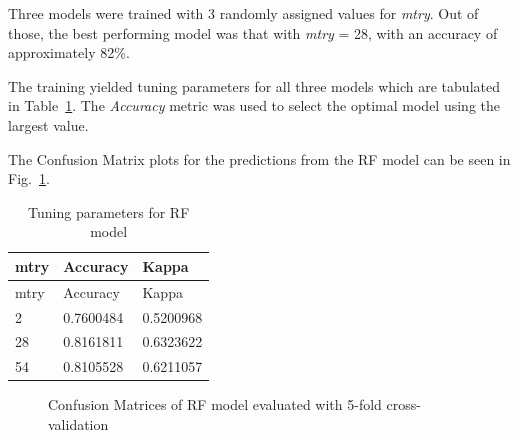 \documentclass[runningheads]{llncs}
\begin{document}
Three models were trained with 3 randomly assigned values for
\emph{mtry}. Out of those, the best performing model was that with
\emph{mtry} = 28, with an accuracy of approximately 82\%.

The training yielded tuning parameters for all three models which are
tabulated in Table~\ref{tbl:rf_params}. The \emph{Accuracy} metric was
used to select the optimal model using the largest value.

The Confusion Matrix plots for the predictions from the RF model can be
seen in Fig.~\ref{fig:rf_cf}.

\hypertarget{tbl:rf_params}{}
\begin{longtable}[]{@{}lll@{}}
\caption{\label{tbl:rf_params}Tuning parameters for RF
model}\tabularnewline
\toprule
mtry & Accuracy & Kappa\tabularnewline
\midrule
\endfirsthead
\toprule
mtry & Accuracy & Kappa\tabularnewline
\midrule
\endhead
2 & 0.7600484 & 0.5200968\tabularnewline
28 & 0.8161811 & 0.6323622\tabularnewline
54 & 0.8105528 & 0.6211057\tabularnewline
\bottomrule
\end{longtable}

\begin{figure}
\centering


\caption{Confusion Matrices of RF model evaluated with 5-fold
cross-validation}

\label{fig:rf_cf}

\end{figure}
\end{document}
